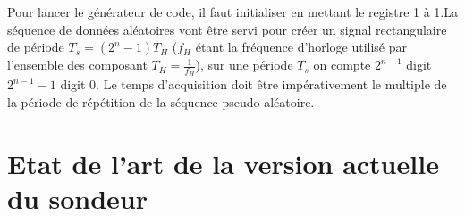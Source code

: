 Pour lancer le générateur de code, il faut initialiser en mettant le registre 1 à 1.La séquence de données aléatoires vont être servi pour créer un signal rectangulaire de période $ {T_s=(2^{n}-1)T_H} $ ($ f_H$ étant la  fréquence d'horloge utilisé par l'ensemble des composant $T_H=\frac{1}{f_H}$), sur une période $T_s$ on compte $2^{n-1}$ digit $2^{n-1}-1$ digit 0. 
Le temps d'acquisition doit être impérativement le multiple de la période de répétition de la séquence pseudo-aléatoire.


\section{Etat de l'art de la version actuelle du sondeur}

